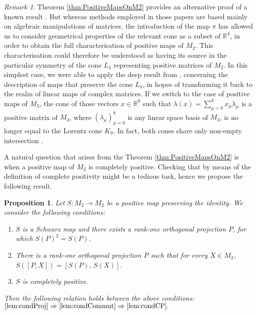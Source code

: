 \documentclass[12pt]{article}
\theoremstyle{plain}
\newtheorem{proposition}{Proposition}
\theoremstyle{definition}
\theoremstyle{remark}
\newtheorem{remark}{Remark}
\numberwithin{equation}{section}
\begin{document}
\begin{remark}
Theorem \ref{thm:PositiveMapsOnM2} provides an alternative
proof of a known result
\cite{stormer1963positive, woronowicz1976positive}.
But whereas methods employed in those papers
are based mainly on algebraic manipulations of matrices,
the introduction of the map $\pi$ has allowed us
to consider geometrical properties of the relevant
cone as a subset of  $\mathbb{R}^{4}$,
in order to obtain the full characterisation of positive maps of $M_{2}$.
This characterisation could therefore be understood
as having its source in the particular symmetry of the cone
$L_{4}$
representing positive matrices of $M_{2}$.
In this simplest case,
we were able to apply the deep result from
\cite{loewy1975positive}, concerning
the description of maps that preserve the cone $L_{4}$,
in hopes of  transforming it back to the realm of linear
maps of complex matrices.
If we switch to the case of positive maps of $M_{3}$,
the cone of those vectors
$x \in \mathbb{R}^{9}$ such that
$\lambda(x) =  \sum_{\mu=0}^{8} x_{\mu} \lambda_{\mu}$
is a positive matrix of $M_{3}$,
where $(\lambda_{\mu})_{\mu=0}^{8}$ is any linear space basis of $M_{3}$,
is no longer equal to the Lorentz cone $K_{9}$.
In fact, both cones share only non-empty intersection
\cite{goyal2011geometry}.
\end{remark}

A natural question that arises from the Theorem \ref{thm:PositiveMapsOnM2}
is when a positive map of $M_{2}$ is completely positive.
Checking that by means of the definition of complete positivity might be a tedious
task, hence we propose the following result.

\begin{proposition}
\label{prop:MapsPreservingIdentity}
Let $S: M_{2} \rightarrow M_{2}$ be a positive map preserving the identity.
We consider the following conditions:
\begin{enumerate}

\item
\label{lem:condProj}
$S$ is a Schwarz map
and there exists a
rank-one orthogonal projection $P$, for which
$S(P)^{2} = S(P)$.

\item
\label{lem:condCommut}
There is a rank-one orthogonal projection $P$
such that for every $X \in M_{2}$,
$S([P,X]) = [S(P), \, S(X)]$.

\item
\label{lem:condCP}
$S$ is completely positive.
\end{enumerate}
Then the following relation holds between the above conditions:
$
\ref{lem:condProj} \Rightarrow
    \ref{lem:condCommut} \Rightarrow \ref{lem:condCP}.
$
\end{proposition}
\end{document}
